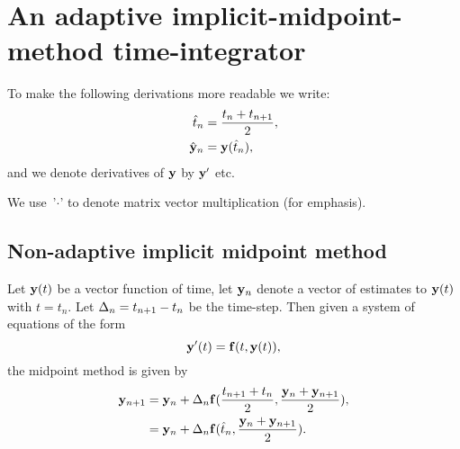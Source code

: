 

\newcommand{\valueatmidpoint}[1]{\hat{#1}}

\newcommand{\thfx}[1]{\valueatmidpoint{t}_{#1}}
\newcommand{\thf}{\thfx{n}}

\newcommand{\yvhfx}[1]{\valueatmidpoint{\yv}_{#1}}
\newcommand{\yvhf}{\yvhfx{n}}

\newcommand{\dfdy}{F}
\newcommand{\dfdyhfx}[1]{\valueatmidpoint{\dfdy_{#1}}}
\newcommand{\dfdyhf}{\dfdyhfx{n}}



\section{An adaptive implicit-midpoint-method time-integrator}









To make the following derivations more readable we write:
\begin{align}
  \thf &= \frac{t_n + t_{n+1}}{2}, \notag\\
  \yvhf &= \yv(\thf), %
\end{align}
and we denote derivatives of $\mathbf{y}$ by $\mathbf{y}'$ etc.

We use~'$\cdot$' to denote matrix vector multiplication (for emphasis).



\subsection{Non-adaptive implicit midpoint method}

Let $\mathbf{y}(t)$ be a vector function of time, let $\mathbf{y}_n$ denote a vector of estimates to $\mathbf{y}(t)$ with $t = t_n$.
Let $\Delta_{n} = t_{n+1} - t_n$ be the time-step.
Then given a system of equations of the form
\begin{equation}
  \mathbf{y}'(t) = {\mathbf{f}}(t, \mathbf{y}(t)),
  \label{eq:43}
\end{equation}
the midpoint method is given by
\begin{align}
  \yv_{n+1} &= \yv_n + \dtn \fv(\frac{t_{n+1} + t_n}{2}, \frac{\yv_n + \yv_{n+1}}{2}), \notag\\
  &= \yv_n + \dtn \fv(\thf, \frac{\yv_n + \yv_{n+1}}{2}).
  \label{eq:basic-midpoint}
\end{align}

